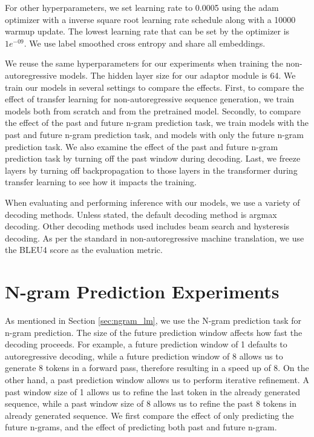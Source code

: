 For other hyperparameters, we set learning rate to 0.0005 using the adam optimizer with a inverse square root learning rate schedule along with a 10000 warmup update. The lowest learning rate that can be set by the optimizer is $1e^{-09}$. We use label smoothed cross entropy and share all embeddings.

We reuse the same hyperparameters for our experiments when training the non-autoregressive models. The hidden layer size for our adaptor module is 64. We train our models in several settings to compare the effects. First, to compare the effect of transfer learning for non-autoregressive sequence generation, we train models both from scratch and from the pretrained model. Secondly, to compare the effect of the past and future n-gram prediction task, we train models with the past and future n-gram prediction task, and models with only the future n-gram prediction task. We also examine the effect of the past and future n-gram prediction task by turning off the past window during decoding. Last, we freeze layers by turning off backpropagation to those layers in the transformer during transfer learning to see how it impacts the training.

When evaluating and performing inference with our models, we use a variety of decoding methods. Unless stated, the default decoding method is argmax decoding. Other decoding methods used includes beam search and hysteresis decoding. As per the standard in non-autoregressive machine translation, we use the BLEU4 score as the evaluation metric.


\section{N-gram Prediction Experiments} \label{sec:n-gram_experiments}
As mentioned in Section \ref{sec:ngram_lm}, we use the N-gram prediction task for n-gram prediction. The size of the future prediction window affects how fast the decoding proceeds. For example, a future prediction window of 1 defaults to autoregressive decoding, while a future prediction window of 8 allows us to generate 8 tokens in a forward pass, therefore resulting in a speed up of 8. On the other hand, a past prediction window allows us to perform iterative refinement. A past window size of 1 allows us to refine the last token in the already generated sequence, while a past window size of 8 allows us to refine the past 8 tokens in already generated sequence. We first compare the effect of only predicting the future n-grams, and the effect of predicting both past and future n-gram. 

